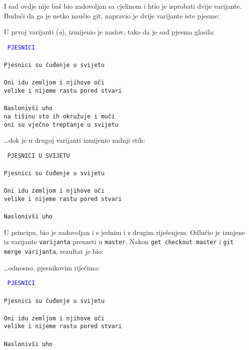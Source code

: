 I sad ovdje nije baš bio zadovoljan sa cjelinom i htio je isprobati dvije varijante.
Budući da ga je netko naučio git, napravio je dvije varijante iste pjesme:



U prvoj varijanti (\emph a), izmijenio je naslov, tako da je sad pjesma glasila:

\vspace{5mm}
\noindent\texttt{%
\textcolor{blue}{PJESNICI}\\%
\\%
Pjesnici su čuđenje u svijetu\\%
\\%
Oni idu zemljom i njihove oči\\%
velike i nijeme rastu pored stvari\\%
\\%
Naslonivši uho\\%
na tišinu sto ih okružuje i muči\\%
oni su vječno treptanje u svijetu}
\vspace{5mm}

\dots{}dok je u drugoj varijanti izmijenio zadnji stih:

\vspace{5mm}
\noindent\texttt{%
PJESNICI U SVIJETU\\%
\\%
Pjesnici su čuđenje u svijetu\\%
\\%
Oni idu zemljom i njihove oči\\%
velike i nijeme rastu pored stvari\\%
\\%
Naslonivši uho\\%
\color{blue}{na ćutanje sto ih okružuje i muči\\%
pjesnici su vječno treptanje u svijetu}}
\vspace{5mm}

U principu, bio je zadovoljan i s jednim i s drugim riješenjem.
Odlučio je izmjene iz varijante \verb+varijanta+ preuzeti u \verb+master+.
Nakon \verb+get checkout master+ i \verb+git merge varijanta+, rezultat je bio:



\dots{}odnosno, pjesnikovim riječima:

\vspace{5mm}
\noindent\texttt{%
\textcolor{blue}{PJESNICI}\\%
\\%
Pjesnici su čuđenje u svijetu\\%
\\%
Oni idu zemljom i njihove oči\\%
velike i nijeme rastu pored stvari\\%
\\%
Naslonivši uho\\%
\color{blue}{na ćutanje sto ih okružuje i muči\\%
pjesnici su vječno treptanje u svijetu}}
\vspace{5mm}

